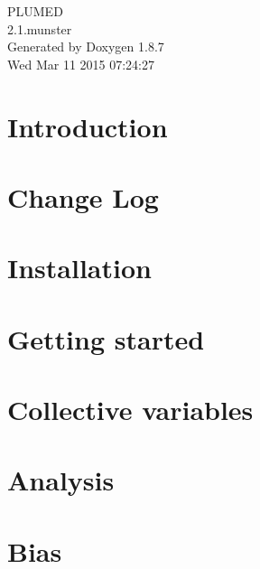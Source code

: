 \documentclass[twoside]{book}
\newcommand{\+}{\discretionary{\mbox{\scriptsize$\hookleftarrow$}}{}{}}
\newcommand{\clearemptydoublepage}{%
  \newpage{\pagestyle{empty}\cleardoublepage}%
}
\begin{document}
\hypersetup{pageanchor=false,
             bookmarks=true,
             bookmarksnumbered=true,
             unicode
            }
\begin{titlepage}
\vspace*{7cm}
\begin{center}%
{\Large P\+L\+U\+M\+E\+D \\[1ex]\large 2.\+1.\+munster }\\
\vspace*{1cm}
{\large Generated by Doxygen 1.8.7}\\
\vspace*{0.5cm}
{\small Wed Mar 11 2015 07:24:27}\\
\end{center}
\end{titlepage}
\clearemptydoublepage
\tableofcontents
\clearemptydoublepage
{}
\hypersetup{pageanchor=true}

\chapter{Introduction}
\label{index}\hypertarget{index}{}
\chapter{Change Log}
\label{_changelog}
\hypertarget{_changelog}{}

\chapter{Installation}
\label{_installation}
\hypertarget{_installation}{}

\chapter{Getting started}
\label{_syntax}
\hypertarget{_syntax}{}

\chapter{Collective variables}
\label{colvarintro}
\hypertarget{colvarintro}{}

\chapter{Analysis}
\label{_analysis}
\hypertarget{_analysis}{}

\chapter{Bias}
\label{_bias}
\hypertarget{_bias}{}

\end{document}
